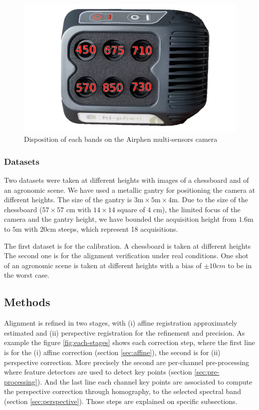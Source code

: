 \documentclass[]{elsarticle}
\begin{document}
	\begin{figure}[H]
		\centering
		\includegraphics[width=0.33\linewidth]{../figures/airphen-detail4}
		\caption{Disposition of each bands on the Airphen multi-sensors camera}
		\label{fig:bands-disposition}
	\end{figure}
	
	\subsubsection{Datasets}
	\par Two datasets were taken at different heights with images of a chessboard and of an agronomic scene.
	We have used a metallic gantry for positioning the camera at different heights.
	The size of the gantry is $3 \si{\meter} \times 5\si{\meter} \times 4\si{\meter}$.
	Due to the size of the chessboard ($57\times57$ cm with $14\times14$ square of $4$ cm), the limited focus of the camera and the gantry height,
	we have bounded the acquisition height from $1.6\si{\meter}$ to $5\si{\meter}$ with $20\si{\centi\meter}$ steeps, which represent 18 acquisitions.
	\\
	\par The first dataset is for the calibration. A chessboard is taken at different heights %
	The second one is for the alignment verification under real conditions.
	One shot of an agronomic scene is taken at different heights %
	with a bias of $\pm 10cm$ to be in the worst case.
	
	\subsection{Methods}
	
	Alignment is refined in two stages, with (i) affine registration approximately estimated and (ii) perspective registration for the refinement and precision.
	As example the figure \ref{fig:each-stages} shows each correction step, where the first line is for the
	(i) affine correction (section \ref{sec:affine}), the second is for (ii) perspective correction.
	More precisely the second are per-channel pre-processing where feature detectors are used to detect key points (section \ref{sec:pre-processing}).
	And the last line each channel key points are associated to compute the perspective correction through homography, to the selected spectral band (section \ref{sec:perspective}).
	Those steps are explained on specific subsections.
	
\end{document}

